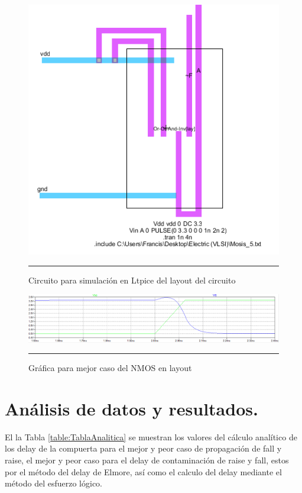 \documentclass[12pt,a4paper]{article} %
\begin{document}
\begin{figure}[htbp]
\begin{center}
    \includegraphics[scale=0.5]{./layout_sim.png}
    \rule{35em}{0.5pt}
  \caption[Captura]{Circuito para simulación en Ltpice del layout del circuito}
  \label{fig:layout_sim}
  \end{center}
\end{figure}

\begin{figure}[htbp]
\begin{center}
    \includegraphics[scale=0.5]{./layout_mejor_graf.png}
    \rule{35em}{0.5pt}
  \caption[Captura]{Gráfica para mejor caso del NMOS en layout}
  \label{fig:layout_graf}
  \end{center}
\end{figure}

\section{Análisis de datos y resultados.}

El la Tabla \ref{table:TablaAnalitica} se muestran los valores del cálculo analítico de los delay de la compuerta para el mejor y peor caso de propagación de fall y raise, el mejor y peor caso para el delay de contaminación de raise y fall, estos por el método del delay de Elmore, así como el calculo del delay mediante el método del esfuerzo lógico.\\
\end{document}
